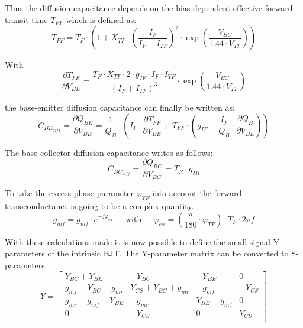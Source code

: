 \documentclass[10pt]{report}
\begin{document}
Thus the diffusion capacitance depends on the bias-dependent effective
forward transit time $T_{FF}$ which is defined as:
\begin{equation}
T_{FF} = T_F \cdot\left(1 + X_{TF} \cdot \left(\dfrac{I_F}{I_F + I_{TF}}\right)^2 \cdot \exp{\left(\dfrac{V_{BC}}{1.44\cdot V_{TF}}\right)}\right)
\end{equation}

With
\begin{equation}
\frac{\partial T_{FF}}{\partial V_{BE}} = \dfrac{T_F\cdot X_{TF}\cdot 2\cdot g_{IF}\cdot I_F\cdot I_{TF}}{\left(I_F + I_{TF}\right)^3}\cdot \exp{\left(\dfrac{V_{BC}}{1.44\cdot V_{TF}}\right)}
\end{equation}

the base-emitter diffusion capacitance can finally be written as:
\begin{equation}
C_{BE_{diff}} = \dfrac{\partial Q_{BE}}{\partial V_{BE}} = \dfrac{1}{Q_B}\cdot \left(I_F\cdot \dfrac{\partial T_{FF}}{\partial V_{BE}} + T_{FF}\cdot\left(g_{IF} - \dfrac{I_F}{Q_B}\cdot \dfrac{\partial Q_B}{\partial V_{BE}}\right)\right)
\end{equation}

The base-collector diffusion capacitance writes as follows:
\begin{equation}
C_{BC_{diff}} = \dfrac{\partial Q_{BC}}{\partial V_{BC}} = T_{R} \cdot g_{IR}
\end{equation}

To take the excess phase parameter $\varphi_{TF}$ into account the
forward transconductance is going to be a complex quantity.
\begin{equation}
g_{mf} = g_{mf}\cdot e^{-j\varphi_{ex}}
\;\;\;\; \textrm{ with } \;\;\;\;
\varphi_{ex} = \left(\dfrac{\pi}{180}\cdot\varphi_{TF}\right)\cdot T_F\cdot 2\pi f
\end{equation}

With these calculations made it is now possible to define the small
signal Y-parameters of the intrinsic BJT.  The Y-parameter matrix can
be converted to S-parameters.
\begin{equation}
Y =
\begin{bmatrix}
Y_{BC} + Y_{BE} & -Y_{BC} & -Y_{BE} & 0\\
g_{mf} - Y_{BC} - g_{mr} & Y_{CS} + Y_{BC} + g_{mr}& - g_{mf} & -Y_{CS}\\
g_{mr} - g_{mf} - Y_{BE} & -g_{mr} & Y_{BE} + g_{mf} & 0\\
0 & -Y_{CS} & 0 & Y_{CS}\\
\end{bmatrix}
\end{equation}
\end{document}
